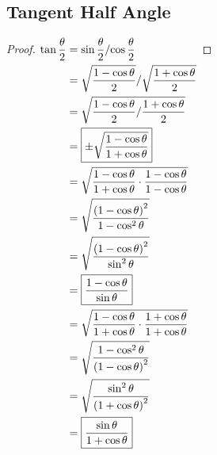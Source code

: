 \documentclass{article}
\begin{document}
\subsection{Tangent Half Angle}
\label{proof:tanhalf}
\begin{proof}
	$\begin{aligned}[t]
		\tan\frac{\theta}{2}&=\sin\frac{\theta}{2}/{\cos\frac{\theta}{2}} \\
		&=\sqrt{\frac{1-\cos\theta}{2}}/\sqrt{\frac{1+\cos\theta}{2}} \\
		&=\sqrt{\frac{1-\cos\theta}{2}/\frac{1+\cos\theta}{2}} \\
		&=\boxed{\pm\sqrt{\frac{1-\cos\theta}{1+\cos\theta}}} \\
		&=\sqrt{\frac{1-\cos\theta}{1+\cos\theta}\cdot\frac{1-\cos\theta}{1-\cos\theta}} \\
		&=\sqrt{\frac{\left(1-\cos\theta\right)^2}{1-\cos^2\theta}} \\
		&=\sqrt{\frac{\left(1-\cos\theta\right)^2}{\sin^2\theta}} \\
		&=\boxed{\frac{1-\cos\theta}{\sin\theta}} \\
		&=\sqrt{\frac{1-\cos\theta}{1+\cos\theta}\cdot\frac{1+\cos\theta}{1+\cos\theta}} \\
		&=\sqrt{\frac{1-\cos^2\theta}{\left(1-\cos\theta\right)^2}} \\
		&=\sqrt{\frac{\sin^2\theta}{\left(1+\cos\theta\right)^2}} \\
		&=\boxed{\frac{\sin\theta}{1+\cos\theta}} \\
	\end{aligned} \\$
\end{proof}
\end{document}
